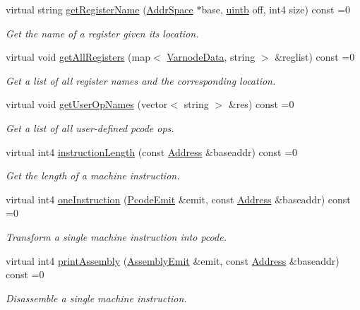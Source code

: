 \begin{DoxyCompactItemize}
virtual string \mbox{\hyperlink{class_translate_a1da0ef001f801641313d9168fb359f02}{get\+Register\+Name}} (\mbox{\hyperlink{class_addr_space}{Addr\+Space}} $\ast$base, \mbox{\hyperlink{types_8h_a2db313c5d32a12b01d26ac9b3bca178f}{uintb}} off, int4 size) const =0
\begin{DoxyCompactList}\small\item\em Get the name of a register given its location. \end{DoxyCompactList}\item 
virtual void \mbox{\hyperlink{class_translate_a4de12a5d1ad5f080604451e2ed3c163e}{get\+All\+Registers}} (map$<$ \mbox{\hyperlink{struct_varnode_data}{Varnode\+Data}}, string $>$ \&reglist) const =0
\begin{DoxyCompactList}\small\item\em Get a list of all register names and the corresponding location. \end{DoxyCompactList}\item 
virtual void \mbox{\hyperlink{class_translate_a2475ba8a71e0d514903b3b5458e6cf45}{get\+User\+Op\+Names}} (vector$<$ string $>$ \&res) const =0
\begin{DoxyCompactList}\small\item\em Get a list of all {\itshape user-\/defined} pcode ops. \end{DoxyCompactList}\item 
virtual int4 \mbox{\hyperlink{class_translate_aa7139376886fccfdcda529fc74f7b382}{instruction\+Length}} (const \mbox{\hyperlink{class_address}{Address}} \&baseaddr) const =0
\begin{DoxyCompactList}\small\item\em Get the length of a machine instruction. \end{DoxyCompactList}\item 
virtual int4 \mbox{\hyperlink{class_translate_a1737782c38ee43de62ae2e7572321fc9}{one\+Instruction}} (\mbox{\hyperlink{class_pcode_emit}{Pcode\+Emit}} \&emit, const \mbox{\hyperlink{class_address}{Address}} \&baseaddr) const =0
\begin{DoxyCompactList}\small\item\em Transform a single machine instruction into pcode. \end{DoxyCompactList}\item 
virtual int4 \mbox{\hyperlink{class_translate_ac97443bb89e0c6bfb68caf9f48a8c85d}{print\+Assembly}} (\mbox{\hyperlink{class_assembly_emit}{Assembly\+Emit}} \&emit, const \mbox{\hyperlink{class_address}{Address}} \&baseaddr) const =0
\begin{DoxyCompactList}\small\item\em Disassemble a single machine instruction. \end{DoxyCompactList}\end{DoxyCompactItemize}
